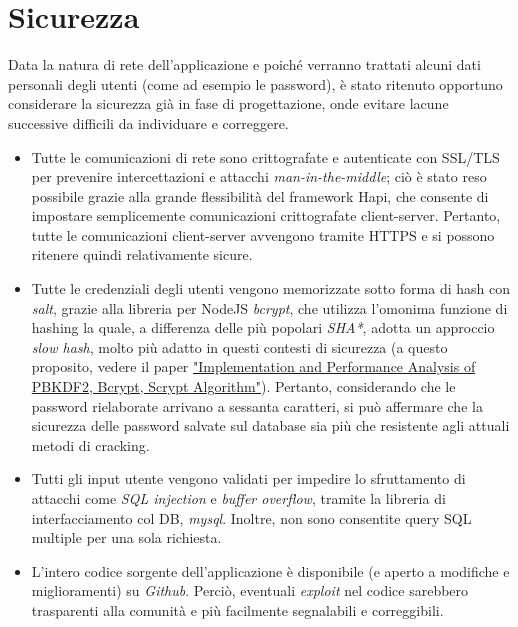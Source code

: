 \documentclass[11pt]{report}
\begin{document}
\section{Sicurezza}
Data la natura di rete dell'applicazione e poiché verranno trattati alcuni dati personali degli utenti (come ad esempio le password), è stato ritenuto opportuno considerare la sicurezza già in fase di progettazione, onde evitare lacune successive difficili da individuare e correggere.
\begin{itemize}
	\item Tutte le comunicazioni di rete sono crittografate e autenticate con SSL/TLS per prevenire intercettazioni e attacchi \textit{man-in-the-middle}; ciò è stato reso possibile grazie alla grande flessibilità del framework Hapi, che consente di impostare semplicemente comunicazioni crittografate client-server.
	Pertanto, tutte le comunicazioni client-server avvengono tramite HTTPS e si possono ritenere quindi relativamente sicure.
	\item Tutte le credenziali degli utenti vengono memorizzate sotto forma di hash con \textit{salt}, grazie alla libreria per NodeJS \textit{bcrypt}, che utilizza l'omonima funzione di hashing la quale, a differenza delle più popolari \textit{SHA*}, adotta un approccio \textit{slow hash}, molto più adatto in questi contesti di sicurezza (a questo proposito, vedere il paper \href{http://worldcomp-proceedings.com/proc/p2016/ICW3865.pdf}{"Implementation and Performance Analysis of PBKDF2, Bcrypt, Scrypt Algorithm"}).
	Pertanto, considerando che le password rielaborate arrivano a sessanta caratteri, si può affermare che la sicurezza delle password salvate sul database sia più che resistente agli attuali metodi di cracking.
	\item Tutti gli input utente vengono validati per impedire lo sfruttamento di attacchi come \textit{SQL injection} e \textit{buffer overflow}, tramite la libreria di interfacciamento col DB, \textit{mysql}. Inoltre, non sono consentite query SQL multiple per una sola richiesta.
	\item L'intero codice sorgente dell'applicazione è disponibile (e aperto a modifiche e miglioramenti) su \textit{Github}.
	Perciò, eventuali \textit{exploit} nel codice sarebbero trasparenti alla comunità e più facilmente segnalabili e correggibili.
\end{itemize}
\pagebreak
\end{document}
